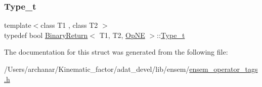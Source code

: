 \subsubsection{\texorpdfstring{Type\_t}{Type\_t}\hspace{0.1cm}{\footnotesize\ttfamily [2/2]}}
{\footnotesize\ttfamily template$<$class T1 , class T2 $>$ \\
typedef bool \mbox{\hyperlink{structBinaryReturn}{Binary\+Return}}$<$ T1, T2, \mbox{\hyperlink{structOpNE}{Op\+NE}} $>$\+::\mbox{\hyperlink{structBinaryReturn_3_01T1_00_01T2_00_01OpNE_01_4_af07b822218544651a5f4470391645f55}{Type\+\_\+t}}}



The documentation for this struct was generated from the following file\+:\begin{DoxyCompactItemize}
\item 
/\+Users/archanar/\+Kinematic\+\_\+factor/adat\+\_\+devel/lib/ensem/\mbox{\hyperlink{lib_2ensem_2ensem__operator__tags_8h}{ensem\+\_\+operator\+\_\+tags.\+h}}\end{DoxyCompactItemize}
